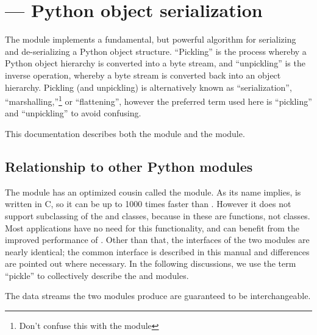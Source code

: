 \section{ --- Python object serialization}



The  module implements a fundamental, but powerful
algorithm for serializing and de-serializing a Python object
structure.  ``Pickling'' is the process whereby a Python object
hierarchy is converted into a byte stream, and ``unpickling'' is the
inverse operation, whereby a byte stream is converted back into an
object hierarchy.  Pickling (and unpickling) is alternatively known as
``serialization'', ``marshalling,''\footnote{Don't confuse this with
the  module} or ``flattening'',
however the preferred term used here is ``pickling'' and
``unpickling'' to avoid confusing.

This documentation describes both the  module and the 
 module.

\subsection{Relationship to other Python modules}

The  module has an optimized cousin called the
 module.  As its name implies,  is
written in C, so it can be up to 1000 times faster than
.  However it does not support subclassing of the
 and  classes, because in
 these are functions, not classes.  Most applications
have no need for this functionality, and can benefit from the improved
performance of .  Other than that, the interfaces of
the two modules are nearly identical; the common interface is
described in this manual and differences are pointed out where
necessary.  In the following discussions, we use the term ``pickle''
to collectively describe the  and
 modules.

The data streams the two modules produce are guaranteed to be
interchangeable.

